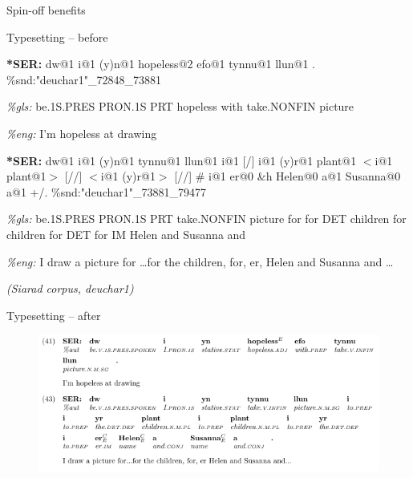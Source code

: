 \documentclass[hyperref={pdfpagelabels=false}, 14pt]{beamer}
\begin{document}
\begin{frame}{}
\begin{center}
\begin{huge} \textcolor{ESRCred}{Spin-off benefits} \end{huge}
\end{center}
\end{frame}


\begin{frame}{Typesetting -- before}
\begin{footnotesize}

\textbf{*SER:}   dw@1 i@1 (y)n@1 hopeless@2 efo@1 tynnu@1 llun@1 . \%snd:"deuchar1"\_72848\_73881

\textit{\%gls:}   be.1S.PRES PRON.1S PRT hopeless with take.NONFIN picture

\textit{\%eng:}   I'm hopeless at drawing

\textbf{*SER:}   dw@1 i@1 (y)n@1 tynnu@1 llun@1 i@1 [/] i@1 (y)r@1 plant@1 $<$i@1 plant@1$>$ [//] $<$i@1 (y)r@1$>$ [//] \# i@1 er@0 \&h Helen@0 a@1 Susanna@0 a@1 +/. \%snd:"deuchar1"\_73881\_79477

\textit{\%gls:}   be.1S.PRES PRON.1S PRT take.NONFIN picture for for DET children for children for DET for IM Helen and Susanna and

\textit{\%eng:}   I draw a picture for \dots for the children, for, er, Helen and Susanna and \dots

\end{footnotesize}
\begin{small}
\hfill\textit{(Siarad corpus, deuchar1)}
\end{small}
\end{frame}


\begin{frame}{Typesetting -- after}
  \begin{figure}[h]
  \centering
  \includegraphics[scale=0.7]{images/deuchar1.png}
  \end{figure}
\end{frame}
\end{document}
